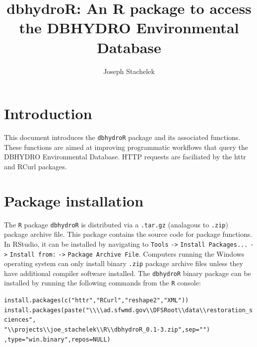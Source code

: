 \documentclass[12pt,notitlepage]{article}
\author{Joseph Stachelek}
\title{dbhydroR: An R package to access the DBHYDRO Environmental Database}
\begin{document}

\maketitle
 


\section{Introduction}

This document introduces the \texttt{dbhydroR} package and its associated functions. These functions are aimed at improving programmatic workflows that query the DBHYDRO Environmental Database. HTTP requests are faciliated by the httr \citep{httr} and RCurl \citep{rcurl} packages. 

\section{Package installation}

The \texttt{R} package \texttt{dbhydroR} is distributed via a \texttt{.tar.gz} (analagous to \texttt{.zip}) package archive file. This package contains the source code for package functions. In RStudio, it can be installed by navigating to \texttt{Tools} \verb|->| \texttt{Install Packages...} \verb|->| \texttt{Install from:} \verb|->| \texttt{Package Archive File}. Computers running the Windows operating system can only install binary \texttt{.zip} package archive files unless they have additional compiler software installed. The \texttt{dbhydroR} binary package can be installed by running the following commands from the \texttt{R} console:

\vspace{10pt}
\noindent\texttt{install.packages(c("httr","RCurl","reshape2","XML"))}\\
\noindent\texttt{install.packages(paste(}\verb|"\\\\ad.sfwmd.gov\\DFSRoot\\data\\restoration_sciences",|\\
\verb|"\\projects\\joe_stachelek\\R\\dbhydroR_0.1-3.zip",sep="")|\\
\texttt{,type="win.binary",repos=NULL)}
\end{document}
